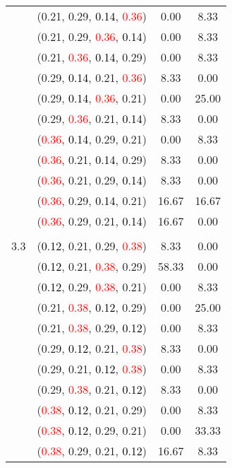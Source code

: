 \documentclass[10pt,a4paper]{report}
\begin{document}
\begin{center}
\begin{longtable}{clcc}
			&(0.21, 0.29, \textcolor{black}{0.14}, \textcolor{red}{0.36})&0.00&8.33\\
			&(0.21, 0.29, \textcolor{red}{0.36}, \textcolor{black}{0.14})&0.00&8.33\\
			&(0.21, \textcolor{red}{0.36}, \textcolor{black}{0.14}, 0.29)&0.00&8.33\\
			&(0.29, \textcolor{black}{0.14}, 0.21, \textcolor{red}{0.36})&8.33&0.00\\
			&(0.29, \textcolor{black}{0.14}, \textcolor{red}{0.36}, 0.21)&0.00&25.00\\
			&(0.29, \textcolor{red}{0.36}, 0.21, \textcolor{black}{0.14})&8.33&0.00\\
			&(\textcolor{red}{0.36}, \textcolor{black}{0.14}, 0.29, 0.21)&0.00&8.33\\
			&(\textcolor{red}{0.36}, 0.21, \textcolor{black}{0.14}, 0.29)&8.33&0.00\\
			&(\textcolor{red}{0.36}, 0.21, 0.29, \textcolor{black}{0.14})&8.33&0.00\\
			&(\textcolor{red}{0.36}, 0.29, \textcolor{black}{0.14}, 0.21)&16.67&16.67\\
			&(\textcolor{red}{0.36}, 0.29, 0.21, \textcolor{black}{0.14})&16.67&0.00\\
		&&&\\
		3.3			&(\textcolor{black}{0.12}, 0.21, 0.29, \textcolor{red}{0.38})&8.33&0.00\\
			&(\textcolor{black}{0.12}, 0.21, \textcolor{red}{0.38}, 0.29)&58.33&0.00\\
			&(\textcolor{black}{0.12}, 0.29, \textcolor{red}{0.38}, 0.21)&0.00&8.33\\
			&(0.21, \textcolor{red}{0.38}, \textcolor{black}{0.12}, 0.29)&0.00&25.00\\
			&(0.21, \textcolor{red}{0.38}, 0.29, \textcolor{black}{0.12})&0.00&8.33\\
			&(0.29, \textcolor{black}{0.12}, 0.21, \textcolor{red}{0.38})&8.33&0.00\\
			&(0.29, 0.21, \textcolor{black}{0.12}, \textcolor{red}{0.38})&0.00&8.33\\
			&(0.29, \textcolor{red}{0.38}, 0.21, \textcolor{black}{0.12})&8.33&0.00\\
			&(\textcolor{red}{0.38}, \textcolor{black}{0.12}, 0.21, 0.29)&0.00&8.33\\
			&(\textcolor{red}{0.38}, \textcolor{black}{0.12}, 0.29, 0.21)&0.00&33.33\\
			&(\textcolor{red}{0.38}, 0.29, 0.21, \textcolor{black}{0.12})&16.67&8.33\\
		\bottomrule
	\end{longtable}
\end{center}
\end{document}
